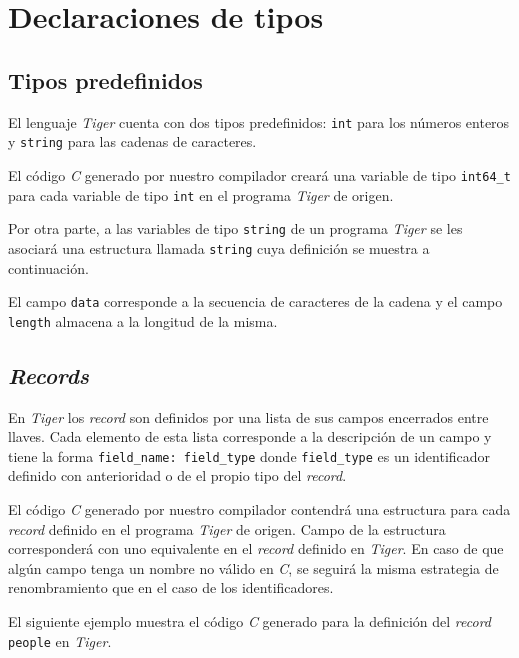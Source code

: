\documentclass{article}
\begin{document}
\section{Declaraciones de tipos}

\subsection{Tipos predefinidos}

El lenguaje \textit{Tiger} cuenta con dos tipos predefinidos: \texttt{int} para
los números enteros y \texttt{string} para las cadenas de caracteres. 

El código \textit{C} generado por nuestro compilador creará una variable de
tipo \texttt{int64\_t} para cada variable de tipo \texttt{int} en el programa
\textit{Tiger} de origen.

Por otra parte, a las variables de tipo \texttt{string} de un programa
\textit{Tiger} se les asociará una estructura llamada \texttt{string} cuya
definición se muestra a continuación.

\begin{quote}

\end{quote}

El campo \texttt{data} corresponde a la secuencia de caracteres de la cadena y
el campo \texttt{length} almacena a la longitud de la misma.

\subsection{\emph{Records}}

En \textit{Tiger} los \textit{record} son definidos por una lista de sus campos
encerrados entre llaves. Cada elemento de esta lista corresponde a la
descripción de un campo y tiene la forma \verb|field_name: field_type| donde
\texttt{field\_type} es un identificador definido con anterioridad o de el
propio tipo del \emph{record}.

El código \textit{C} generado por nuestro compilador contendrá una estructura
para cada \textit{record} definido en el programa \textit{Tiger} de origen. 
Campo de la estructura corresponderá con uno equivalente en el \textit{record}
definido en \emph{Tiger}. En caso de que algún campo tenga un nombre no válido
en \emph{C}, se seguirá la misma estrategia de renombramiento que en el caso de
los identificadores.

El siguiente ejemplo muestra el código \textit{C} generado para la definición
del \textit{record} \texttt{people} en \emph{Tiger}.
\end{document}
